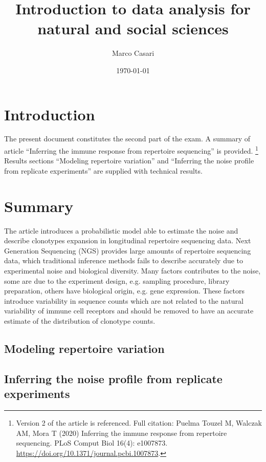 \documentclass[a4paper]{article}
\title{Introduction to data analysis for natural and social sciences}
\author{Marco Casari}
\date{\today}
\begin{document}
\maketitle

\section{Introduction}
The present document constitutes the second part of the exam. A summary of article ``Inferring the immune response from repertoire sequencing'' is provided.%
\footnote{Version 2 of the article is referenced. Full citation: Puelma Touzel M, Walczak AM, Mora T (2020) Inferring the immune response from repertoire sequencing. PLoS Comput Biol 16(4): e1007873. \url{https://doi.org/10.1371/journal.pcbi.1007873}.}
Results sections ``Modeling repertoire variation'' and ``Inferring the noise profile from replicate experiments'' are supplied with technical results.


\section{Summary}
The article introduces a probabilistic model able to estimate the noise and describe clonotypes expansion in longitudinal repertoire sequencing data.
Next Generation Sequencing (NGS) provides large amounts of repertoire sequencing data, which traditional inference methods fails to describe accurately due to experimental noise and biological diversity. Many factors contributes to the noise, some are due to the experiment design, e.g. sampling procedure, library preparation, others have biological origin, e.g. gene expression. These factors introduce variability in sequence counts which are not related to the natural variability of immune cell receptors and should be removed to have an accurate estimate of the distribution of clonotype counts.

\subsection{Modeling repertoire variation}

\subsection{Inferring the noise profile from replicate experiments}
\end{document}
